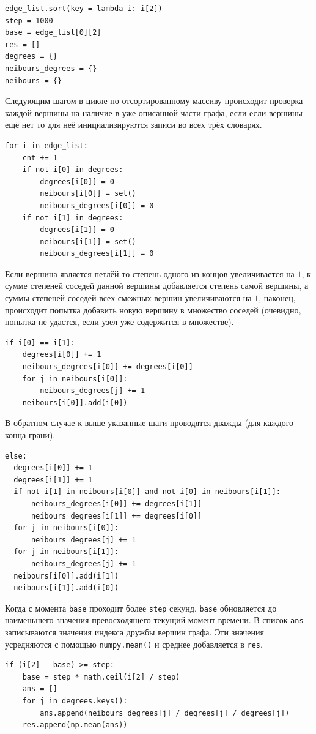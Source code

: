 \documentclass[bachelor, och, diploma]{SCWorks}
\begin{document}
\begin{verbatim}
edge_list.sort(key = lambda i: i[2])
step = 1000
base = edge_list[0][2]
res = []
degrees = {}
neibours_degrees = {}
neibours = {}
\end{verbatim}
Следующим шагом в цикле по отсортированному массиву происходит проверка каждой вершины на наличие в уже описанной части графа, если если вершины ещё нет то для неё инициализируются записи во всех трёх словарях.
\begin{verbatim}
for i in edge_list:
    cnt += 1
    if not i[0] in degrees:
        degrees[i[0]] = 0
        neibours[i[0]] = set()
        neibours_degrees[i[0]] = 0
    if not i[1] in degrees:
        degrees[i[1]] = 0
        neibours[i[1]] = set()
        neibours_degrees[i[1]] = 0
\end{verbatim}
Если вершина является петлёй то степень одного из концов увеличивается на $1$, к сумме степеней соседей данной вершины добавляется степень самой вершины, а суммы степеней соседей всех смежных вершин увеличиваются на $1$, наконец, происходит попытка добавить новую вершину в множество соседей (очевидно, попытка не удастся, если узел уже содержится в множестве).
\begin{verbatim}
if i[0] == i[1]:
    degrees[i[0]] += 1
    neibours_degrees[i[0]] += degrees[i[0]]
    for j in neibours[i[0]]:
        neibours_degrees[j] += 1
    neibours[i[0]].add(i[0])
\end{verbatim}
В обратном случае к выше указанные шаги проводятся дважды (для каждого конца грани).
\begin{verbatim}
else:
  degrees[i[0]] += 1
  degrees[i[1]] += 1
  if not i[1] in neibours[i[0]] and not i[0] in neibours[i[1]]:
      neibours_degrees[i[0]] += degrees[i[1]]
      neibours_degrees[i[1]] += degrees[i[0]]
  for j in neibours[i[0]]:
      neibours_degrees[j] += 1
  for j in neibours[i[1]]:
      neibours_degrees[j] += 1
  neibours[i[0]].add(i[1])
  neibours[i[1]].add(i[0])
\end{verbatim}
Когда с момента \texttt{base} проходит более \texttt{step} секунд, \texttt{base} обновляется до наименьшего значения превосходящего текущий момент времени. В список \texttt{ans} записываются значения индекса дружбы вершин графа. Эти значения усредняются с помощью \texttt{numpy.mean()} и среднее добавляется в \texttt{res}.
\begin{verbatim}
if (i[2] - base) >= step:
    base = step * math.ceil(i[2] / step)
    ans = []
    for j in degrees.keys():
        ans.append(neibours_degrees[j] / degrees[j] / degrees[j])
    res.append(np.mean(ans))
\end{verbatim}
\end{document}
